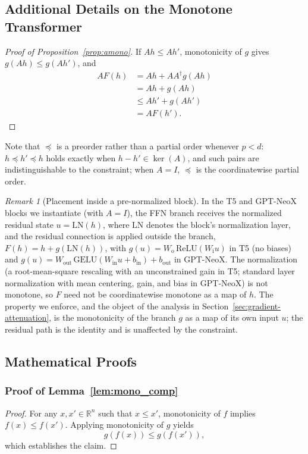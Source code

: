 \documentclass{article}
\theoremstyle{plain}
\theoremstyle{definition}
\theoremstyle{remark}
\newtheorem{remark}[theorem]{Remark}
\theoremstyle{plain}
\begin{document}
\subsection{Additional Details on the Monotone Transformer}
\label{app:model-details}
\begin{proof}[Proof of Proposition~\ref{prop:amono}]
If $Ah \le Ah'$, monotonicity of $g$ gives $g(Ah) \le g(Ah')$, and
\begin{align*}
A F(h)
&= Ah + A A^\dagger g(Ah) \\
&= Ah + g(Ah) \\
&\le Ah' + g(Ah') \\
&= A F(h').
\end{align*}

\end{proof}

Note that $\preceq$ is a preorder rather than a partial order whenever $p < d$: $h \preceq h' \preceq h$ holds exactly when $h - h' \in \ker(A)$, and such pairs are indistinguishable to the constraint; when $A = I$, $\preceq$ is the coordinatewise partial order.

\begin{remark}[Placement inside a pre-normalized block]
\label{rem:preln}
In the T5 and GPT-NeoX blocks we instantiate (with $A = I$), the FFN branch receives the normalized residual state $u = \mathrm{LN}(h)$, where $\mathrm{LN}$ denotes the block's normalization layer, and the residual connection is applied outside the branch, $F(h) = h + g(\mathrm{LN}(h))$, with $g(u) = W_{\mathrm{o}}\,\mathrm{ReLU}(W_{\mathrm{i}} u)$ in T5 (no biases) and $g(u) = W_{\mathrm{out}}\,\mathrm{GELU}(W_{\mathrm{in}} u + b_{\mathrm{in}}) + b_{\mathrm{out}}$ in GPT-NeoX. The normalization (a root-mean-square rescaling with an unconstrained gain in T5; standard layer normalization with mean centering, gain, and bias in GPT-NeoX) is not monotone, so $F$ need not be coordinatewise monotone as a map of $h$. The property we enforce, and the object of the analysis in Section~\ref{sec:gradient-attenuation}, is the monotonicity of the branch $g$ as a map of its own input $u$; the residual path is the identity and is unaffected by the constraint.
\end{remark}

\subsection{Mathematical Proofs}
\label{app:proofs}
\subsubsection{Proof of Lemma~\ref{lem:mono_comp}}
\label{prf:lem1}
\begin{proof}
For any $x, x' \in \mathbb{R}^n$ such that $x \le x'$, monotonicity of $f$ implies $f(x) \le f(x')$. Applying monotonicity of $g$ yields
\[
g(f(x)) \le g(f(x')),
\]
which establishes the claim.
\end{proof}
\end{document}
